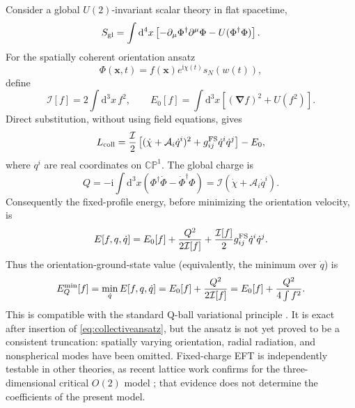 \documentclass[11pt]{article}
\numberwithin{equation}{section}
\newcommand{\CP}{\mathbb{CP}}
\newcommand{\cI}{\mathcal I}
\newcommand{\dd}{\mathrm d}
\newcommand{\ii}{\mathrm i}
\begin{document}
Consider a global \(U(2)\)-invariant scalar theory in flat spacetime,
\begin{equation}
 S_{\rm gl}=\int\dd^4x\left[-\partial_\mu\Phi^\dagger\partial^\mu\Phi
 -U(\Phi^\dagger\Phi)\right].
 \label{eq:globalaction}
\end{equation}
For the spatially coherent orientation ansatz
\begin{equation}
 \Phi(\bm x,t)=f(\bm x)e^{\ii\chi(t)}s_N(w(t)),
 \label{eq:collectiveansatz}
\end{equation}
define
\begin{equation}
 \cI[f]=2\int\dd^3x\,f^2,
 \qquad
 E_0[f]=\int\dd^3x\left[(\bm\nabla f)^2+U(f^2)\right].
 \label{eq:inertia}
\end{equation}
Direct substitution, without using field equations, gives
\begin{equation}
 L_{\rm coll}=\frac{\cI}{2}\left[
 (\dot\chi+\mathcal A_i\dot q^i)^2
 +g^{\rm FS}_{ij}\dot q^i\dot q^j\right]-E_0,
 \label{eq:lcoll}
\end{equation}
where \(q^i\) are real coordinates on \(\CP^1\).  The global charge is
\begin{equation}
 Q=-\ii\int\dd^3x
 (\Phi^\dagger\dot\Phi-\dot\Phi^\dagger\Phi)
 =\cI(\dot\chi+\mathcal A_i\dot q^i).
 \label{eq:Qglobal}
\end{equation}
Consequently the fixed-profile energy, before minimizing the orientation
velocity, is
\begin{equation}
 E[f,q,\dot q]=E_0[f]+\frac{Q^2}{2\cI[f]}
 +\frac{\cI[f]}{2}g^{\rm FS}_{ij}\dot q^i\dot q^j.
 \label{eq:fixedQenergyfull}
\end{equation}
Thus the orientation-ground-state value (equivalently, the minimum over
\(\dot q\)) is
\begin{equation}
 E_Q^{\rm min}[f]=\min_{\dot q}E[f,q,\dot q]
 =E_0[f]+\frac{Q^2}{2\cI[f]}
 =E_0[f]+\frac{Q^2}{4\int f^2}.
 \label{eq:fixedQenergy}
\end{equation}
This is compatible with the standard Q-ball variational principle
\cite{Coleman1985APE1,HeeckSokhashvili2023,EspinosaHeeckSokhashvili2023}.
It is exact after insertion of \eqref{eq:collectiveansatz}, but the ansatz is
not yet proved to be a consistent truncation: spatially varying orientation,
radial radiation, and nonspherical modes have been omitted.  Fixed-charge EFT
is independently testable in other theories, as recent lattice work confirms
for the three-dimensional critical \(O(2)\) model \cite{CuomoEtAl2024}; that
evidence does not determine the coefficients of the present model.
\end{document}
